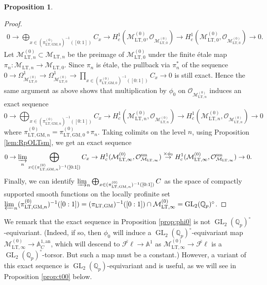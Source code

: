 \documentclass{article}
\theoremstyle{definition}
\newtheorem{proposition}[theorem]{Proposition}
\def\calM{\mathcal{M}}
\def\calO{\mathcal{O}}
\def\bbA{\mathbb{A}}
\def\bbQ{\mathbb{Q}}
\DeclareMathOperator{\GL}{GL}
\def\LT{\mathrm{LT}}
\def\an{\mathrm{an}}
\def\sm{\mathrm{sm}}
\def\fl{\mathscr{F}\ell}
\def\GM{\mathrm{GM}}
\def\ov{\stackrel}
\begin{document}
\begin{proposition}
\begin{proof}
\begin{align*}
    0\to \bigoplus_{x\in (\pi_{\LT,\GM,0}^{(0)})^{-1}([0:1])}C_x\to H^1_c(\calM_{\LT,0}^{(0)},\calO_{\calM_{\LT,0}^{(0)}})\to H^1_c(\calM_{\LT,0}^{(0)},\calO_{\calM_{\LT,0}^{(0)}})\to 0.
\end{align*}
Let $\calM_{\LT,n}^{(0)}\subset \calM_{\LT,n}$ be the preimage of $\calM_{\LT,0}^{(0)}$ under the finite \'etale map $\pi_n:\calM_{\LT,n}\to \calM_{\LT,0}$. Since $\pi_n$ is \'etale, the pullback via $\pi_n^*$ of the sequence $0\rightarrow \Omega^1_{\calM_{\LT,0}^{(0)}}\rightarrow \Omega^1_{\calM_{\LT,0}^{(0)}}\rightarrow \prod_{x\in (\pi_{\LT,\GM,0}^{(0)})^{-1}([0:1])}C_x\rightarrow 0$ is still exact. Hence the same argument as above shows that multiplication by $\phi_0$ on $\calO_{\calM_{\LT,n}^{(0)}}$ induces an exact sequence
\[0\to \bigoplus_{x\in (\pi_{\LT,\GM,n}^{(0)})^{-1}([0:1])}C_x\to H^1_c(\calM_{\LT,n}^{(0)},\calO_{\calM_{\LT,n}^{(0)}})\to H^1_c(\calM_{\LT,n}^{(0)},\calO_{\calM_{\LT,n}^{(0)}})\to 0\]
where $\pi_{\LT,\GM,n}^{(0)}= \pi_{\LT,\GM,0}^{(0)}\circ\pi_n$. Taking colimits on the level $n$, using Proposition \ref{lem:RpOLTsm}, we get an exact sequence
\begin{align*}
    0\to \varinjlim_n\bigoplus_{x\in (\pi_{\LT,\GM,n}^{(0)})^{-1}([0:1])}C_x\to H^1_c(\calM_{\LT,\infty}^{(0)},\calO_{\calM_{\LT,\infty}}^{\sm}) \ov{\times \phi_0}\to H^1_c(\calM_{\LT,\infty}^{(0)},\calO_{\calM_{\LT,\infty}}^{\sm})\to 0.
\end{align*}
Finally, we can identify $\varinjlim_n\bigoplus_{x\in (\pi_{\LT,\GM,n}^{(0)})^{-1}([0:1])}C$ as the space of compactly supported smooth functions on the locally profinite set $\varprojlim_{n}(\pi_{\LT,\GM,n}^{(0)})^{-1}([0:1])=(\pi_{\LT,\GM})^{-1}([0:1])\cap \calM_{\LT,\infty}^{(0)}=\GL_2(\bbQ_p)^{\circ}$.
\end{proof}
\end{proposition}
We remark that the exact sequence in Proposition \ref{prop:phi0} is not $\GL_2(\bbQ_p)^{\circ}$-equivariant. (Indeed, if so, then $\phi_0$ will induce a $\GL_2(\bbQ_p)^{\circ}$-equivariant map $\calM_{\LT,\infty}^{(0)}\to \bbA^{1,\an}_C$, which will descend to $\check{\fl}\to \bbA^1$ as $\calM_{\LT,\infty}^{(0)}\to \check{\fl}$ is a $\GL_2(\bbQ_p)^{\circ}$-torsor. But such a map must be a constant.) However, a variant of this exact sequence is $\GL_2(\bbQ_p)$-equivariant and is useful, as we will see in Proposition \ref{prop:t00} below.
\end{document}
